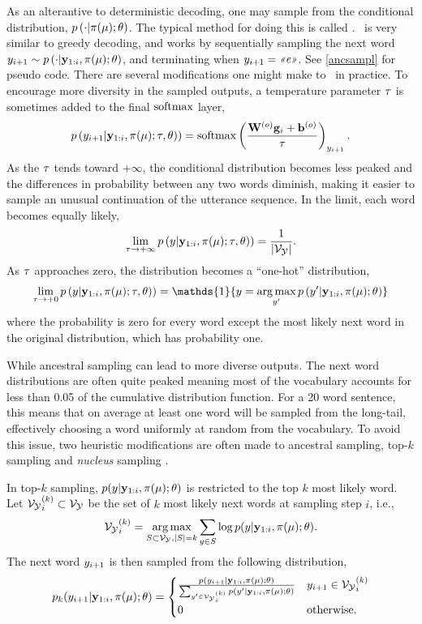 As an alterantive to deterministic decoding, one may sample from the conditional distribution, $p\left(\cdot|\pi(\mu);\theta\right)$. The typical
method for doing this is called \ancestralsampling. \Ancestralsampling~is
very similar to greedy decoding, and works by sequentially sampling the 
next word $y_{i+1} \sim p\left(\cdot|\mathbf{y}_{1:i},\pi(\mu);\theta\right)$, and terminating when $y_{i+1} = \textit{<<e>>}$. See \autoref{ancsampl} for pseudo code. There are several modifications one might make to \ancestralsampling~in practice. To encourage more diversity in the sampled outputs,
a temperature parameter $\tau$ is sometimes added to the final $\operatorname*{softmax}$ layer, 
\[ p\left(y_{i+1}| \mathbf{y}_{1:i},\pi(\mu); \tau, \theta) \right) = 
\operatorname*{softmax}\left( \frac{\mathbf{W}^{(o)}\mathbf{g}_i + \mathbf{b}^{(o)}}{\tau} \right)_{y_{i+1}}.\]
As the $\tau$ tends toward $+\infty$, the conditional distribution becomes less peaked and the differences in probability between any two words diminish, making it easier to sample an unusual continuation of the utterance sequence.
In the limit, each word becomes equally likely,
\[ \lim_{\tau\rightarrow +\infty} 
p\left(y| \mathbf{y}_{1:i},\pi(\mu); \tau, \theta) \right) =
\frac{1}{{\left\vert \mathcal{V}_{\mathcal{Y}} \right\vert}}.\]
As $\tau$ approaches zero, the distribution becomes a ``one-hot''
distribution,
\[ \lim_{\temperature\rightarrow +0} 
\gen\left(\utttok| \utttoks_{1:i},\ls(\mr); \temperature, \params) \right) =
\mathds{1}\{\utttok = \argmax_{\utttok^\prime} \gen\left(\utttok^\prime| \utttoks_{1:i},\ls(\mr); \params\right)  \}\] where the probability is zero
for every word except the most likely next word in the original distribution,
which has probability one.

While ancestral sampling can lead to more diverse outputs. The next word
distributions are often quite peaked meaning most of the vocabulary accounts
for less than
0.05 of the cumulative distribution function. For a 20 word sentence,
this means that on average at least one word will be sampled from the long-tail, effectively choosing a word uniformly at random from the vocabulary.
To avoid this issue, two heuristic modifications are often made to ancestral
sampling, top-$k$ sampling \citep{somebody} and \textit{nucleus} sampling 
\citep{nuke}. 

In top-$k$ sampling, $p(y|\mathbf{y}_{1:i},\pi(\mu);\theta)$ is 
restricted to the top $k$ most likely word. Let ${\mathcal{V}_{\mathcal{Y}}}_i^{(k)} \subset \mathcal{V}_{\mathcal{Y}}$ be 
the set of $k$ most likely next words at sampling step $i$, i.e.,
\[{\mathcal{V}_{\mathcal{Y}}}_i^{(k)} = \operatorname*{arg\,max}_{S \subset \mathcal{V}_{\mathcal{Y}}, {\left\vert S \right\vert} = k} \sum_{y \in S} \log p(y|\mathbf{y}_{1:i},\pi(\mu);\theta). \]
The next word $y_{i+1}$ is then sampled from the following distribution,
\[
    p_k(y_{i+1}|\mathbf{y}_{1:i},\pi(\mu);\theta)
    =
    \begin{cases} 
   \frac{
   p(y_{i+1}|\mathbf{y}_{1:i},\pi(\mu);\theta)
   }{ 
       \sum_{y^\prime \in {\mathcal{V}_{\ensuremath{\mathcal{Y}}}}_i^{(k)}}
   p(y^\prime|\mathbf{y}_{1:i},\pi(\mu);\theta)  
   }  & y_{i+1} \in {\mathcal{V}_{\ensuremath{\mathcal{Y}}}}_i^{(k)} \\ 
0 & \textrm{otherwise}. \end{cases} 
\]

